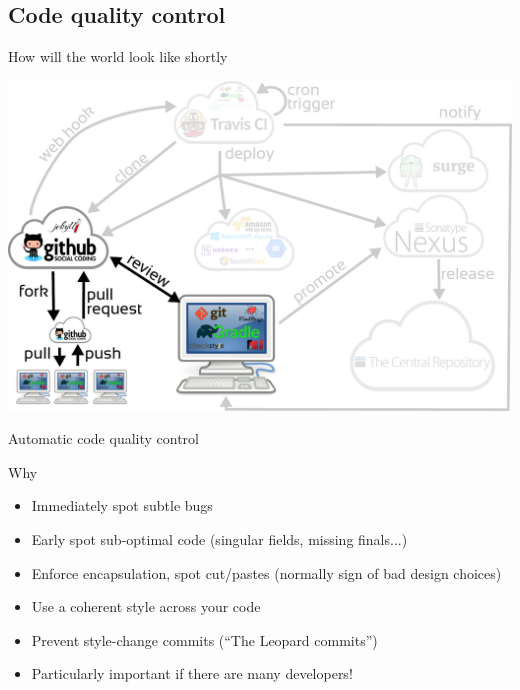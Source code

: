 \documentclass[presentation]{beamer}
\begin{document}
\subsection{Code quality control}

\begin{frame}[fragile]{How will the world look like shortly}
	\begin{center}
		\includegraphics[width=.9\textwidth]{images/ci-codequality}
	\end{center}
\end{frame}

\begin{frame}[fragile]{Automatic code quality control}
	\begin{block}{Why}
		\begin{itemize}
			\item Immediately spot subtle bugs
			\item Early spot sub-optimal code (singular fields, missing finals...)
			\item Enforce encapsulation, spot cut/pastes (normally sign of bad design choices)
			\item Use a coherent style across your code
			\item Prevent style-change commits (``The Leopard commits'')
			\item Particularly important if there are many developers!
		\end{itemize}
	\end{block}
\end{frame}
\end{document}
